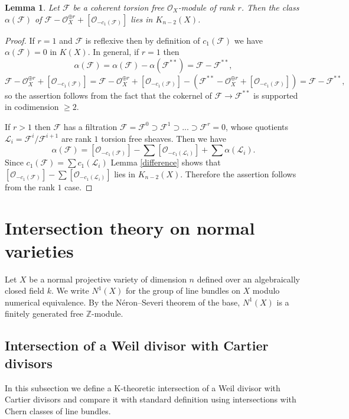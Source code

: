 \documentclass[twoside, 11pt]{article}
\theoremstyle{plain}
\newtheorem{Lemma}[Thm]{\sc Lemma}
\theoremstyle{definition}
\theoremstyle{remark}
\newcommand{\ZZ}{{\mathbb Z}}
\newcommand{\cF}{{\mathcal F}}
\newcommand{\cL}{{\mathcal L}}
\newcommand{\cO}{{\mathcal O}}
\begin{document}
\medskip

\begin{Lemma}\label{reflexive-in-K(X)}
Let $\cF$ be a coherent  torsion free $\cO_X$-module of rank $r$. Then the class $\alpha (\cF)$ of  
$\cF- \cO_X^{\oplus r}+[\cO_{-c_1 (\cF)}]$ lies in $K_{n-2}(X)$.
\end{Lemma}

\begin{proof}
If  $r=1$ and $\cF$ is reflexive then by definition of $c_1 (\cF)$ we have
$\alpha (\cF)=0$ in $K(X)$.  In general, if $r=1$ then
$$\alpha (\cF)=\alpha (\cF)-\alpha (\cF ^{**})= \cF- \cF ^{**}, 
$$
$$\cF- \cO_X^{\oplus r}+[\cO_{-c_1 (\cF)}]= \cF- \cO_X^{\oplus r}+[\cO_{-c_1 (\cF)}] -(\cF ^{**}- \cO_X^{\oplus r}+[\cO_{-c_1 (\cF)}])= \cF- \cF ^{**}, 
$$
so the assertion follows from the fact that the cokernel of
$\cF\to \cF^{**}$ is supported in codimension $\ge 2$.


If $r>1$ then $\cF$ has a filtration $\cF=\cF^0\supset \cF^1\supset ...\supset \cF ^r=0$, whose quotients $\cL_i=\cF^i/\cF^{i+1}$ are rank $1$ torsion free sheaves.
  Then we have
  $$\alpha (\cF)= [\cO _{-c_1(\cF)} ]- \sum  [\cO _{-c_1(\cL _i)} ]+  
  \sum \alpha (\cL _i).$$
  Since $c_1(\cF) =\sum c_1(\cL_i)$ Lemma \ref{difference} shows that $ [\cO _{-c_1(\cF)} ]- \sum  [\cO _{-c_1(\cL _i)} ]$
  lies in $K_{n-2}(X)$. Therefore the assertion follows from the rank $1$ case.
\end{proof}

\section{Intersection theory on normal varieties}\label{Section:intersection}

Let $X$ be a normal projective variety of dimension $n$ defined over an algebraically closed field $k$.
We  write $N^1(X)$ for the group of line bundles on $X$ modulo numerical equivalence. By the N\'eron--Severi theorem of the base, $N^1(X)$ is a finitely generated free $\ZZ$-module.



\subsection{Intersection of a Weil divisor with Cartier divisors}

In this subsection we define a K-theoretic intersection of a Weil divisor with Cartier divisors
and compare it with standard definition using intersections with Chern classes of line bundles.
\end{document}
